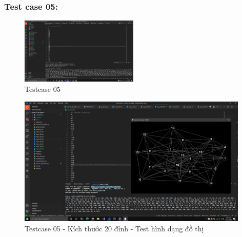 \documentclass{article}
\begin{document}
\subsubsection{Test case 05:}
\begin{figure}[H]
\centering
\includegraphics[width=0.5\textwidth]{Test_Case_05.png}
\caption{Testcase 05}
\end{figure}
\begin{figure}[H]
\centering
\includegraphics[width=0.98\textwidth]{Test_Case_06_Content.png}
\caption{Testcase 05 - Kích thước 20 đỉnh - Test hình dạng đồ thị}
\end{figure}
\end{document}
